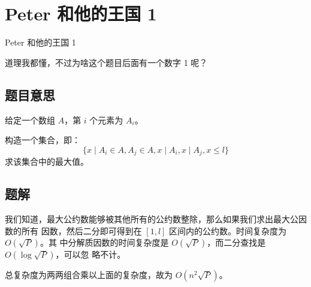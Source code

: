 \def\sectionName{Peter 和他的王国 1}
\section{\sectionName}



\begin{frame}

\isBeamerMode\relax
    {\Huge \sectionName}\par
\fi




道理我都懂，不过为啥这个题目后面有一个数字 1 呢？



\end{frame}

\subsection{题目意思}
\begin{frame} %
给定一个数组 $A$，第 $i$ 个元素为 $A_i$。

构造一个集合，即：\[\{x \mid A_i \in A, A_j \in A, x \mid A_i, x \mid A_j, x \le
l\}\]求该集合中的最大值。
\end{frame}



\subsection{题解}
\begin{frame} %
我们知道，最大公约数能够被其他所有的公约数整除，那么如果我们求出最大公因数的所有
因数，然后二分即可得到在 $[1, l]$ 区间内的公约数。时间复杂度为 $O(\sqrt P)$。其
中分解质因数的时间复杂度是 $O(\sqrt P)$，而二分查找是 $O(\log \sqrt P)$，可以忽
略不计。

总复杂度为两两组合乘以上面的复杂度，故为 $O(n^2 \sqrt P)$。
\end{frame}
